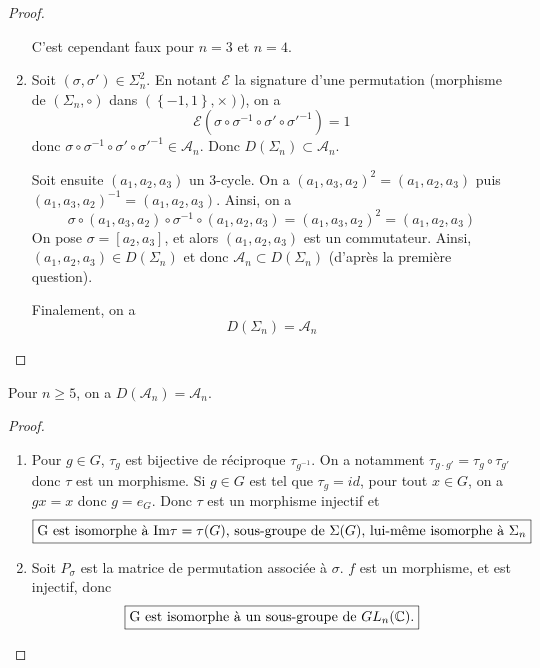 \documentclass[12pt]{article}
\begin{document}
\begin{proof}
\begin{enumerate}
		C'est cependant faux pour $n=3$ et $n=4$.

		\item Soit $(\sigma,\sigma')\in\Sigma_{n}^{2}$. En notant $\mathcal{E}$ la signature d'une permutation (morphisme de $(\Sigma_{n},\circ)$ dans $(\left\{-1,1\right\},\times)$), on a
		\begin{equation}
			\mathcal{E}(\sigma\circ\sigma^{-1}\circ\sigma'\circ\sigma'^{-1})=1
		\end{equation}
		donc $\sigma\circ\sigma^{-1}\circ\sigma'\circ\sigma'^{-1}\in\mathcal{A}_{n}$. Donc $D(\Sigma_{n})\subset\mathcal{A}_{n}$.

		Soit ensuite $(a_{1},a_{2},a_{3})$ un 3-cycle. On a $(a_{1},a_{3},a_{2})^{2}=(a_{1},a_{2},a_{3})$ puis\\$(a_{1},a_{3},a_{2})^{-1}=(a_{1},a_{2},a_{3})$. Ainsi, on a 
		\begin{equation}
			\sigma\circ(a_{1},a_{3},a_{2})\circ\sigma^{-1}\circ(a_{1},a_{2},a_{3})=(a_{1},a_{3},a_{2})^{2}=(a_{1},a_{2},a_{3})
		\end{equation}
		On pose $\sigma=[a_{2},a_{3}]$, et alors $(a_{1},a_{2},a_{3})$ est un commutateur. Ainsi, $(a_{1},a_{2},a_{3})\in D(\Sigma_{n})$ et donc $\mathcal{A}_{n}\subset D(\Sigma_{n})$ (d'après la première question).

		Finalement, on a 
		\begin{equation}
			\boxed{D(\Sigma_{n})=\mathcal{A}_{n}}
		\end{equation}
	\end{enumerate}
\end{proof}

\begin{remark}
	Pour $n\geqslant5$, on a $D(\mathcal{A}_{n})=\mathcal{A}_{n}$.
\end{remark}

\begin{proof}
	\phantom{}
	\begin{enumerate}
		\item Pour $g\in G$, $\tau_{g}$ est bijective de réciproque $\tau_{g^{-1}}$. On a notamment $\tau_{g\cdot g'}=\tau_{g}\circ\tau_{g'}$ donc $\tau$ est un morphisme. Si $g\in G$ est tel que $\tau_{g}=id$, pour tout $x\in G$, on a $gx=x$ donc $g=e_{G}$. Donc $\tau$ est un morphisme injectif et 
		\begin{equation}
			\boxed{\text{G est isomorphe à }\mathrm{Im}\tau=\tau(G)\text{, sous-groupe de }\Sigma(G)\text{, lui-même isomorphe à }\Sigma_{n}}
		\end{equation}
		
		\item Soit 
		$P_{\sigma}$ est la matrice de permutation associée à $\sigma$. $f$ est un morphisme, et est injectif, donc 
		\begin{equation}
			\boxed{\text{G est isomorphe à un sous-groupe de }GL_{n}(\mathbb{C}).}
		\end{equation}
	\end{enumerate}
\end{proof}
\end{document}
